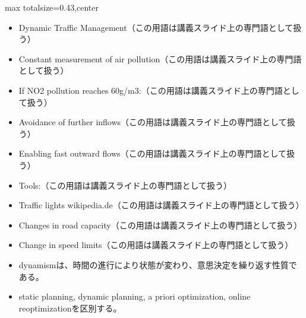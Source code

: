 \clearpage
{}
\begin{minipage}[t]{0.405\textwidth}
\begin{adjustbox}{max totalsize={\textwidth}{0.43\textheight},center}
\begin{minipage}{\textwidth}\scriptsize
{}\begin{itemize}
\item Dynamic Traffic Management（この用語は講義スライド上の専門語として扱う）
\item Constant measurement of air pollution（この用語は講義スライド上の専門語として扱う）
\item If NO2 pollution reaches 60g/m3:（この用語は講義スライド上の専門語として扱う）
\item Avoidance of further inflows（この用語は講義スライド上の専門語として扱う）
\item Enabling fast outward flows（この用語は講義スライド上の専門語として扱う）
\item Tools:（この用語は講義スライド上の専門語として扱う）
\item Traffic lights wikipedia.de（この用語は講義スライド上の専門語として扱う）
\item Changes in road capacity（この用語は講義スライド上の専門語として扱う）
\item Change in speed limits（この用語は講義スライド上の専門語として扱う）
\end{itemize}\begin{itemize}
\item dynamismは、時間の進行により状態が変わり、意思決定を繰り返す性質である。
\item static planning, dynamic planning, a priori optimization, online reoptimizationを区別する。
\end{itemize}
\end{minipage}
\end{adjustbox}
\end{minipage}\hfill
